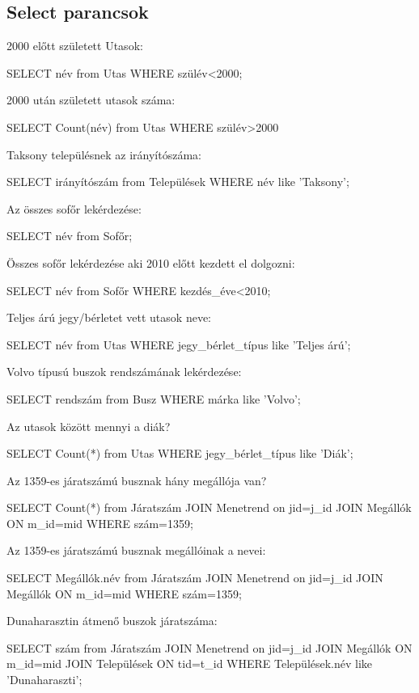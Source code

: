 \documentclass[12pt]{article}
\begin{document}
\subsection{Select parancsok}
2000 előtt született Utasok:
\begin{spverbatim}
SELECT név from Utas WHERE szülév<2000;
\end{spverbatim}
2000 után született utasok száma:
\begin{spverbatim}
SELECT Count(név) from Utas WHERE szülév>2000
\end{spverbatim}
Taksony településnek az irányítószáma:
\begin{spverbatim}
SELECT irányítószám from Települések WHERE név like 'Taksony';
\end{spverbatim}
Az összes sofőr lekérdezése:
\begin{spverbatim}
SELECT név from Sofőr;
\end{spverbatim}
Összes sofőr lekérdezése aki 2010 előtt kezdett el dolgozni:
\begin{spverbatim}
SELECT név from Sofőr WHERE kezdés_éve<2010;
\end{spverbatim}
Teljes árú jegy/bérletet vett utasok neve:
\begin{spverbatim}
SELECT név from Utas WHERE jegy_bérlet_típus like 'Teljes árú';
\end{spverbatim}
Volvo típusú buszok rendszámának lekérdezése:
\begin{spverbatim}
SELECT rendszám from Busz WHERE márka like 'Volvo';
\end{spverbatim}
Az utasok között mennyi a diák?
\begin{spverbatim}
SELECT Count(*) from Utas WHERE jegy_bérlet_típus like 'Diák';
\end{spverbatim}
Az 1359-es járatszámú busznak hány megállója van?
\begin{spverbatim}
SELECT Count(*) from Járatszám JOIN Menetrend on jid=j_id JOIN Megállók ON m_id=mid WHERE szám=1359;
\end{spverbatim}
Az 1359-es járatszámú busznak megállóinak a nevei:
\begin{spverbatim}
SELECT Megállók.név from Járatszám JOIN Menetrend on jid=j_id JOIN Megállók ON m_id=mid WHERE szám=1359;
\end{spverbatim}
Dunaharasztin átmenő buszok járatszáma:
\begin{spverbatim}
SELECT szám from Járatszám JOIN Menetrend on jid=j_id JOIN Megállók ON m_id=mid JOIN Települések ON tid=t_id WHERE Települések.név like 'Dunaharaszti';
\end{spverbatim}
\end{document}
